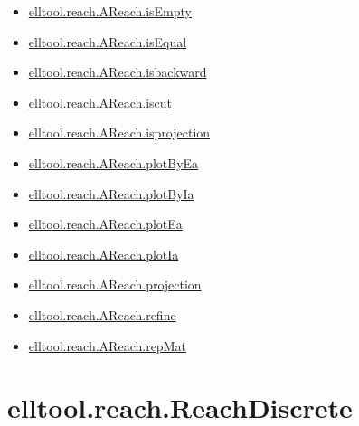 \documentclass[letterpaper,10pt,english]{sphinxmanual}
\begin{document}
\begin{itemize}
\item {} 
{\hyperref[chap_functions:elltool-reach-areach-isempty]{elltool.reach.AReach.isEmpty}}

\item {} 
{\hyperref[chap_functions:elltool-reach-areach-isequal]{elltool.reach.AReach.isEqual}}

\item {} 
{\hyperref[chap_functions:elltool-reach-areach-isbackward]{elltool.reach.AReach.isbackward}}

\item {} 
{\hyperref[chap_functions:elltool-reach-areach-iscut]{elltool.reach.AReach.iscut}}

\item {} 
{\hyperref[chap_functions:elltool-reach-areach-isprojection]{elltool.reach.AReach.isprojection}}

\item {} 
{\hyperref[chap_functions:elltool-reach-areach-plotbyea]{elltool.reach.AReach.plotByEa}}

\item {} 
{\hyperref[chap_functions:elltool-reach-areach-plotbyia]{elltool.reach.AReach.plotByIa}}

\item {} 
{\hyperref[chap_functions:elltool-reach-areach-plotea]{elltool.reach.AReach.plotEa}}

\item {} 
{\hyperref[chap_functions:elltool-reach-areach-plotia]{elltool.reach.AReach.plotIa}}

\item {} 
{\hyperref[chap_functions:elltool-reach-areach-projection]{elltool.reach.AReach.projection}}

\item {} 
{\hyperref[chap_functions:elltool-reach-areach-refine]{elltool.reach.AReach.refine}}

\item {} 
{\hyperref[chap_functions:elltool-reach-areach-repmat]{elltool.reach.AReach.repMat}}

\end{itemize}


\section{elltool.reach.ReachDiscrete}
\label{chap_functions:elltool-reach-reachdiscrete}
\end{document}
